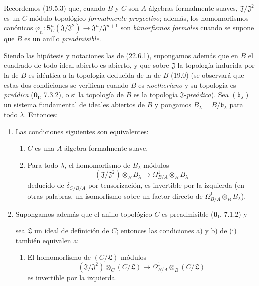 Recordemos (19.5.3) que, cuando $B$ y $C$ son $A$-álgebras formalmente
suaves, $\mathfrak J/\mathfrak J^2$ es un $C$-módulo topológico
\emph{formalmente proyectivo}; además, los homomorfismos canónicos
$\varphi_n:\mathbf S_C^n(\mathfrak J/\mathfrak J^2)
\longrightarrow\mathfrak J^n/\mathfrak J^{n+1}$ son
\emph{bimorfismos formales} cuando se supone que $B$ es un anillo
\emph{preadmisible}.
\begin{corollary}[22.6.2]
\label{0.22.6.2-fr}
Siendo las hipótesis y notaciones las de \textup{(22.6.1)}, supongamos además que
en $B$ el cuadrado de todo ideal abierto es abierto, y que sobre $\mathfrak J$ la
topología inducida por la de $B$ es idéntica a la topología deducida de
la de $B$ \textup{(19.0)} \textup{(se observará que estas dos condiciones se verifican cuando
$B$ es \emph{noetheriano} y su topología es \emph{preádica} ($\mathbf{0}_{\mathrm I}$, 7.3.2), o si la
topología de $B$ es la topología $\mathfrak J$-\emph{preádica})}. Sea
$(\mathfrak b_\lambda)$ un sistema fundamental de ideales abiertos de $B$ y
pongamos $B_\lambda=B/\mathfrak b_\lambda$ para todo $\lambda$. Entonces:
\begin{enumerate}
  \item[\rm(i)] Las condiciones siguientes son equivalentes:
  \begin{enumerate}
    \item[\textup{a)}] $C$ es una $A$-álgebra formalmente suave.
    \item[\textup{b)}] Para todo $\lambda$, el homomorfismo de $B_\lambda$-módulos
    \begin{equation}
    \label{0.22.6.2.1-fr}
      (\mathfrak J/\mathfrak J^2)\otimes_BB_\lambda
      \longrightarrow\Omega^1_{B/A}\otimes_BB_\lambda
      \tag{22.6.2.1}
    \end{equation}
    deducido de $\delta_{C/B/A}$ por tensorización, es invertible por la izquierda
    \textup{(en otras palabras, un isomorfismo sobre un factor directo de
    $\Omega^1_{B/A}\otimes_BB_\lambda$)}.
  \end{enumerate}
  \item[\rm(ii)] Supongamos además que el anillo topológico $C$ es
  preadmisible \textup{($\mathbf{0}_{\mathrm I}$, 7.1.2)} y


  sea $\mathfrak L$ un ideal de definición de $C$; entonces las condiciones \textup{a)}
  y \textup{b)} de \textup{(i)} también equivalen a:
  \begin{enumerate}
    \item[\textup{c)}] El homomorfismo de $(C/\mathfrak L)$-módulos
    \[
      (\mathfrak J/\mathfrak J^2)\otimes_C(C/\mathfrak L)
      \longrightarrow\Omega^1_{B/A}\otimes_B(C/\mathfrak L)
    \]
    es invertible por la izquierda.
  \end{enumerate}
\end{enumerate}
\end{corollary}

